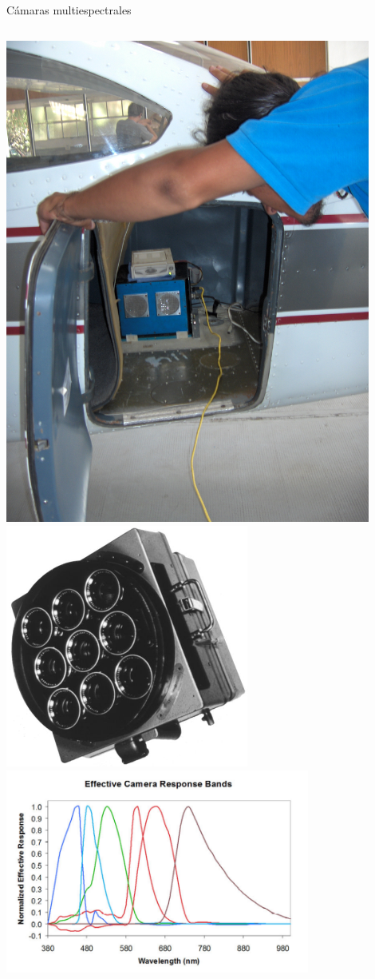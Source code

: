 \documentclass{beamer}
\begin{document}
\begin{frame}{Cámaras multiespectrales}
	\begin{columns}
		\includegraphics[width=0.9\textwidth]{IMGs/camarainta}
		\includegraphics[width=0.6\textwidth]{IMGs/camara_multi}\\
		\includegraphics[width=0.75\textwidth]{IMGs/camara_multi2}
	\end{columns}
\end{frame}
\end{document}
